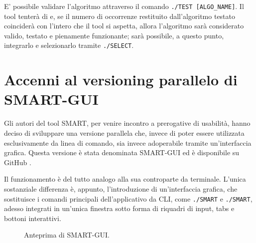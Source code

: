 E' possibile validare l'algoritmo attraverso il comando \verb|./TEST [ALGO_NAME]|. Il tool tenterà di e, se il numero di occorrenze restituito dall'algoritmo testato coinciderà con l'intero che il tool si aspetta, allora l'algoritmo sarà considerato valido, testato e pienamente funzionante; sarà possibile, a questo punto, integrarlo e selezionarlo tramite \verb|./SELECT|.


\section{Accenni al versioning parallelo di SMART-GUI}

Gli autori del tool SMART, per venire incontro a prerogative di usabilità, hanno deciso di sviluppare una versione parallela che, invece di poter essere utilizzata esclusivamente da linea di comando, sia invece adoperabile tramite un'interfaccia grafica. Questa versione è stata denominata SMART-GUI ed è disponibile su GitHub \cite{smartGUI}. 

\vspace{3mm}

Il funzionamento è del tutto analogo alla sua controparte da terminale. L'unica sostanziale differenza è, appunto, l'introduzione di un'interfaccia grafica, che sostituisce i comandi principali dell'applicativo da CLI, come \verb|./SMART| e \verb|./SMART|, adesso integrati in un'unica finestra sotto forma di riquadri di input, tabs e bottoni interattivi.

\vspace{3mm}

\begin{figure}[ht!]
    \centering
    \caption{Anteprima di SMART-GUI.}
    \label{fig:esempio}
\end{figure}

